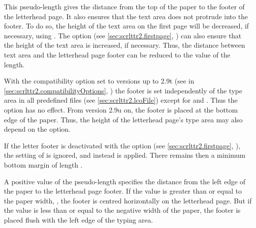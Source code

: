 \begin{Declaration}
\end{Declaration}
This pseudo-length gives the distance from the top of the paper to the footer
of the letterhead page. It also ensures that the text area does not protrude
into the footer. To do so, the height of the text area on the first page will
be decreased, if necessary, using
%
. The
%
 option (see
\autoref{sec:scrlttr2.firstpage},
) can also ensure that the
height of the text area is increased, if necessary. Thus, the distance between
text area and the letterhead page footer can be reduced to the value of the
 length.

With the compatibility option
set to versions up to
2.9t (see
 in
\autoref{sec:scrlttr2.compatibilityOptions},
) the footer is set independently of the
type area in all predefined  files (see \autoref{sec:scrlttr2.lcoFile})
except for  and . Thus the
%
 option has no effect.
From version 2.9u on, the footer is placed at the bottom edge of the paper.
Thus, the height of the letterhead page's type area may also depend on the
 option.

If the letter footer is deactivated with the
%
%
option (see \autoref{sec:scrlttr2.firstpage},
), the setting of
 is ignored, and instead
 is applied. There remains then a
minimum bottom margin of length .%
\EndIndexGroup


\begin{Declaration}
\end{Declaration}
%
A positive value of the 
pseudo-length specifies the distance from the left edge of the paper to the
letterhead page footer. If the value is greater than or equal to the paper
width, , the footer is centred
horizontally on the letterhead page. But if the value is less than or equal to
the negative width of the paper, the footer is placed flush with the left edge
of the typing area.

